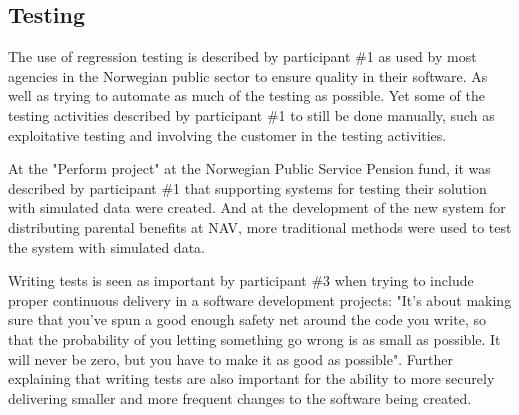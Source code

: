 
\subsection{Testing}
The use of regression testing is described by participant \#1 as used by most agencies in the Norwegian public sector to ensure quality in their software. As well as trying to automate as much of the testing as possible. Yet some of the testing activities described by participant \#1 to still be done manually, such as exploitative testing and involving the customer in the testing activities.


At the "Perform project" at the Norwegian Public Service Pension fund, it was described by participant \#1 that supporting systems for testing their solution with simulated data were created. And at the development of the new system for distributing parental benefits at NAV, more traditional methods were used to test the system with simulated data.


Writing tests is seen as important by participant \#3 when trying to include proper continuous delivery in a software development projects: "It's about making sure that you've spun a good enough safety net around the code you write, so that the probability of you letting something go wrong is as small as possible. It will never be zero, but you have to make it as good as possible". Further explaining that writing tests are also important for the ability to more securely delivering smaller and more frequent changes to the software being created.

